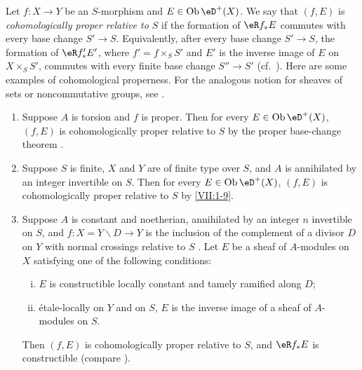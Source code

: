 \documentclass[12pt,oneside,english]{smfbook}
\DeclareMathOperator{\ob}{Ob}
\renewcommand{\setminus}{\smallsetminus}
\begin{document}
Let $f:X\to Y$ be an $S$-morphism and $E\in\ob\eD^+(X)$. We say that $(f,E)$ is \emph{cohomologically proper relative to $S$} if the formation of $\eR f_\ast E$ commutes with every base change $S'\to S$. Equivalently, after every base change $S'\to S$, the formation of $\eR f'_\ast E'$, where $f'=f\times_SS'$ and $E'$ is the inverse image of $E$ on $X\times_SS'$, commutes with every finite base change $S''\to S'$ (cf.\ \cite[XII, 6.1]{sga4}). Here are some examples of cohomological properness. For the analogous notion for sheaves of sets or noncommutative groups, see \cite[XIII]{sga1}.
\begin{enumerate} %
  \item Suppose $A$ is torsion and $f$ is proper. Then for every $E\in\ob\eD^+(X)$, $(f,E)$ is cohomologically proper relative to $S$ by the proper base-change theorem \cite[XII, 5.1]{sga4}.
  \item Suppose $S$ is finite, $X$ and $Y$ are of finite type over $S$, and $A$ is annihilated by an integer invertible on $S$. Then for every $E\in\ob\eD^+(X)$, $(f,E)$ is cohomologically proper relative to $S$ by \ref{VII:1-9}.
  \item Suppose $A$ is constant and noetherian, annihilated by an integer $n$ invertible on $S$, and $f:X=Y\setminus D\to Y$ is the inclusion of the complement of a divisor $D$ on $Y$ with normal crossings relative to $S$ \cite[XIII, 2.1]{sga1}. Let $E$ be a sheaf of $A$-modules on $X$ satisfying one of the following conditions:
    \begin{enumerate}[(i)]
      \item $E$ is constructible locally constant and tamely ramified along $D$;
      \item étale-locally on $Y$ and on $S$, $E$ is the inverse image of a sheaf of $A$-modules on $S$.
    \end{enumerate}
    Then $(f,E)$ is cohomologically proper relative to $S$, and $\eR f_\ast E$ is constructible (compare \cite[XIII, 2.4]{sga1}).
\end{enumerate}
\end{document}
